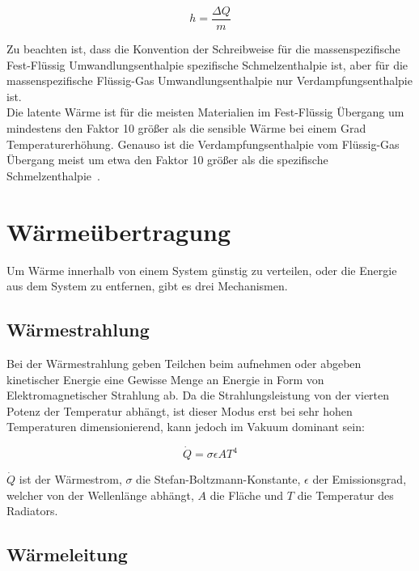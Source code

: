 \begin{equation}
    h = \frac{\Delta Q}{m}
\end{equation}

Zu beachten ist, dass die Konvention der Schreibweise für die massenspezifische Fest-Flüssig Umwandlungsenthalpie spezifische Schmelzenthalpie
ist, aber für die massenspezifische Flüssig-Gas Umwandlungsenthalpie nur Verdampfungsenthalpie ist.\\

Die latente Wärme ist für die meisten Materialien im Fest-Flüssig Übergang um mindestens den Faktor 10 größer als die sensible Wärme bei
einem Grad Temperaturerhöhung. Genauso ist die Verdampfungsenthalpie vom Flüssig-Gas Übergang meist um etwa den Faktor 10 größer als die 
spezifische Schmelzenthalpie~\cite{fusion-vaporization}.

\section{Wärmeübertragung}\label{sec:waermeuebertragung}

Um Wärme innerhalb von einem System günstig zu verteilen, oder die Energie aus dem System zu entfernen, gibt es drei Mechanismen.

\subsection{Wärmestrahlung}\label{sec:strahlung}

Bei der Wärmestrahlung geben Teilchen beim aufnehmen oder abgeben kinetischer Energie eine Gewisse Menge an Energie in Form
von Elektromagnetischer Strahlung ab. Da die Strahlungsleistung von der vierten Potenz der Temperatur
abhängt, ist dieser Modus erst bei sehr hohen Temperaturen dimensionierend, kann jedoch im Vakuum dominant sein:

\begin{equation}
    \label{eq:radiation}
    \dot{Q}=\sigma\epsilon A T^{4}
\end{equation}

$\dot{Q}$ ist der Wärmestrom, $\sigma$ die Stefan-Boltzmann-Konstante, $\epsilon$ der Emissionsgrad, welcher von der Wellenlänge
abhängt, $A$ die Fläche und $T$ die Temperatur des Radiators.

\subsection{Wärmeleitung}\label{sec:waermeleitung}

